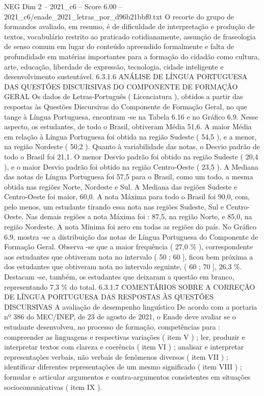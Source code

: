 \begin{textsample}{NEG Dim 2 – 2021\_c6 – Score 6.00 – 2021\_c6/enade\_2021\_letras\_por\_d96b21bbf0.txt}
O recorte do grupo de formandos avaliado, em resumo, é de dificuldade de interpretação e produção de textos, vocabulário restrito ao praticado cotidianamente, assunção de fraseologia de senso comum em lugar do conteúdo apreendido formalmente e falta de profundidade em matérias importantes para a formação do cidadão como cultura, arte, educação, liberdade de expressão, tecnologia, cidade inteligente e desenvolvimento sustentável. 6.3.1.6 ANÁLISE DE LÍNGUA PORTUGUESA DAS QUESTÕES DISCURSIVAS DO COMPONENTE DE FORMAÇÃO GERAL Os dados de Letras-Português ( Licenciatura ), obtidos a partir das respostas às Questões Discursivas do Componente de Formação Geral, no que tange à Língua Portuguesa, encontram -se na Tabela 6.16 e no Gráfico 6.9.
Nesse aspecto, os estudantes, de todo o Brasil, obtiveram Média 51,6.
A maior Média em relação à Língua Portuguesa foi obtida na região Sudeste ( 54,5 ), e a menor, na região Nordeste ( 50,2 ).
Quanto à variabilidade das notas, o Desvio padrão de todo o Brasil foi 21,1.
O menor Desvio padrão foi obtido na região Sudeste ( 20,4 ), e o maior Desvio padrão foi obtido na região Centro-Oeste ( 23,5 ).
A Mediana das notas de Língua Portuguesa foi 57,5 para o Brasil, como um todo, a mesma obtida nas regiões Norte, Nordeste e Sul.
A Mediana das regiões Sudeste e Centro-Oeste foi maior, 60,0.
A nota Máxima para todo o Brasil foi 90,0, com, pelo menos, um estudante tirando essa nota nas regiões Sudeste, Sul e Centro-Oeste.
Nas demais regiões a nota Máxima foi : 87,5, na região Norte, e 85,0, na região Nordeste.
A nota Mínima foi zero em todas as regiões do país.
No Gráfico 6.9, mostra -se a distribuição das notas de Língua Portuguesa do Componente de Formação Geral.
Observa -se que a maior frequência ( 27,0 \% ), correspondente aos estudantes que obtiveram nota no intervalo ( 50 ; 60 ], ficou bem próxima a dos estudantes que obtiveram nota no intervalo seguinte, ( 60 ; 70 ], 26,3 \%.
Destacam -se, também, os estudantes que deixaram a questão em branco, representando 7,3 \% do total. 6.3.1.7 COMENTÁRIOS SOBRE A CORREÇÃO DE LÍNGUA PORTUGUESA DAS RESPOSTAS ÀS QUESTÕES DISCURSIVAS A avaliação de desempenho linguístico De acordo com a portaria nº 386 do MEC/INEP, de 23 de agosto de 2021, o Enade deve avaliar se o estudante desenvolveu, no processo de formação, competências para : compreender as linguagens e respectivas variações ( item V ) ; ler, produzir e interpretar textos com clareza e coerência ( item VI ) ; analisar e interpretar representações verbais, não verbais de fenômenos diversos ( item VII ) ; identificar diferentes representações de um mesmo significado ( item VIII ) ; formular e articular argumentos e contra-argumentos consistentes em situações sociocomunicativas ( item IX ).

\end{textsample}
